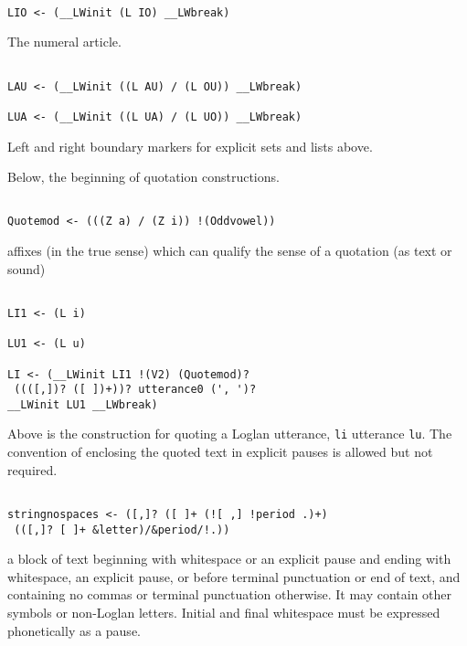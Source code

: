 \documentclass[12pt]{article}
\begin{document}
\begin{verbatim}

LIO <- (__LWinit (L IO) __LWbreak)

\end{verbatim}

The numeral article.

\begin{verbatim}

LAU <- (__LWinit ((L AU) / (L OU)) __LWbreak)

LUA <- (__LWinit ((L UA) / (L UO)) __LWbreak)

\end{verbatim}

Left and right boundary markers for explicit sets and lists above.

Below, the beginning of quotation constructions.

\begin{verbatim}

Quotemod <- (((Z a) / (Z i)) !(Oddvowel))

\end{verbatim}

affixes (in the true sense) which can qualify the sense of a quotation (as text or sound)

\begin{verbatim}

LI1 <- (L i)

LU1 <- (L u)

LI <- (__LWinit LI1 !(V2) (Quotemod)?
 ((([,])? ([ ])+))? utterance0 (', ')? 
__LWinit LU1 __LWbreak)

\end{verbatim}

Above is the construction for quoting a Loglan utterance, {\tt li} utterance {\tt lu}.  The convention of
enclosing the quoted text in explicit pauses is allowed but not required.

\begin{verbatim}

stringnospaces <- ([,]? ([ ]+ (![ ,] !period .)+)
 (([,]? [ ]+ &letter)/&period/!.))

\end{verbatim}

a block of text beginning with whitespace or an explicit pause and ending with whitespace, an explicit pause, or before terminal punctuation or end of text,  and containing no commas or terminal punctuation otherwise.
It may contain other symbols or non-Loglan letters.  Initial and final whitespace must be expressed phonetically as a pause.
\end{document}
